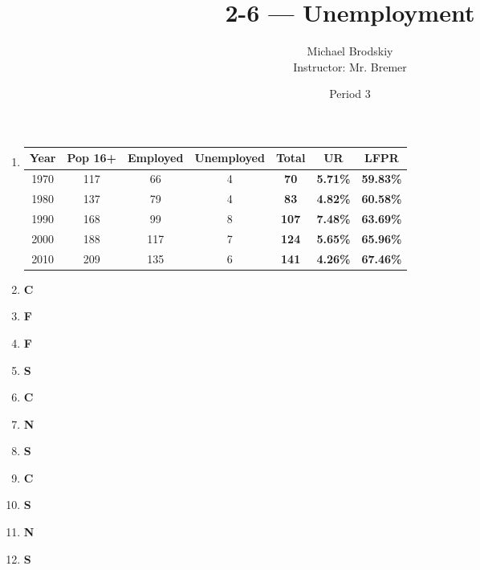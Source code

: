 \documentclass[12pt]{article}
\title{2-6 — Unemployment}
\date{Period 3}
\author{Michael Brodskiy\\ \small Instructor: Mr. Bremer}
\begin{document}
\maketitle

  \begin{enumerate}

    \item   \begin{tabular}{|c|c|ccc|c|c|}
    \hline
    Year & Pop 16+ & Employed & Unemployed & Total & UR & LFPR \\
    \hline
    1970 & 117 & 66 & 4 & \textbf{70} & \textbf{5.71\%} & \textbf{59.83\%}\\
    \hline
    1980 & 137 & 79 & 4 & \textbf{83} & \textbf{4.82\%} & \textbf{60.58\%}\\
    \hline
    1990 & 168 & 99 & 8 & \textbf{107} & \textbf{7.48\%} & \textbf{63.69\%}\\
    \hline
    2000 & 188 & 117 & 7 & \textbf{124} & \textbf{5.65\%} & \textbf{65.96\%}\\
    \hline
    2010 & 209 & 135 & 6 & \textbf{141} & \textbf{4.26\%} & \textbf{67.46\%}\\
    \hline
  \end{tabular}

    \item \textbf{C}

    \item \textbf{F}

    \item \textbf{F}

    \item \textbf{S}

    \item \textbf{C}

    \item \textbf{N}

    \item \textbf{S}

    \item \textbf{C}

    \item \textbf{S}

    \item \textbf{N}

    \item \textbf{S}

  \end{enumerate}
\end{document}
